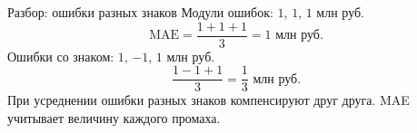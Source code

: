 \begin{frame}{Разбор: ошибки разных знаков}
  Модули ошибок: $1$, $1$, $1$ млн руб.
  \[
    \mathrm{MAE}=\frac{1+1+1}{3}=1\text{ млн руб.}
  \]
  Ошибки со знаком: $1$, $-1$, $1$ млн руб.
  \[
    \frac{1-1+1}{3}=\frac13\text{ млн руб.}
  \]
  При усреднении ошибки разных знаков компенсируют друг друга.
  MAE учитывает величину каждого промаха.
\end{frame}
